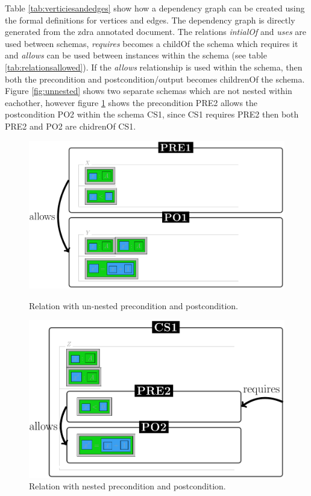 Table \ref{tab:verticiesandedges} show how a dependency graph can be created using the formal definitions for vertices and edges. The dependency graph is directly generated from the \gls{zdra} annotated document. The relations \emph{intialOf} and \emph{uses} are used between schemas, \emph{requires} becomes a childOf the schema which requires it and \emph{allows} can be used between instances within the schema (see table \ref{tab:relationsallowed}). If the \emph{allows} relationship is used within the schema, then both the precondition and postcondition/output becomes childrenOf the schema. Figure \ref{fig:unnested} shows two separate schemas which are not nested within eachother, however figure \ref{fig:nested} shows the precondition PRE2 allows the postcondition PO2 within the schema CS1, since CS1 requires PRE2 then both PRE2 and PO2 are chidrenOf CS1.

\begin{figure}[H]
\centering
\begin{minipage}{0.45\textwidth}
\centering
\includegraphics[scale=0.18]{Figures/Formalising/unnested.png}
\caption{Relation with un-nested precondition and postcondition.  \label{fig:unnested}}
\end{minipage}\hfill
\begin{minipage}{0.45\textwidth}
\centering
\includegraphics[scale=0.18]{Figures/Formalising/nested.png}
\caption{Relation with nested precondition and postcondition.  \label{fig:nested}}
\end{minipage}
\end{figure}

